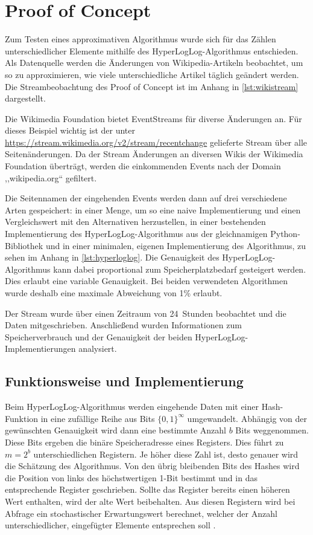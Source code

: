\section{Proof of Concept}

Zum Testen eines approximativen Algorithmus wurde sich für das Zählen unterschiedlicher Elemente mithilfe des HyperLogLog-Algorithmus entschieden.
Als Datenquelle werden die Änderungen von Wikipedia-Artikeln beobachtet, um so zu approximieren, wie viele unterschiedliche Artikel täglich geändert werden.
Die Streambeobachtung des Proof of Concept ist im Anhang in \autoref{lst:wikistream} dargestellt.

Die Wikimedia Foundation bietet EventStreams für diverse Änderungen an.
Für dieses Beispiel wichtig ist der unter \url{https://stream.wikimedia.org/v2/stream/recentchange} gelieferte Stream über alle Seitenänderungen.
Da der Stream Änderungen an diversen Wikis der Wikimedia Foundation überträgt, werden die einkommenden Events nach der Domain ,,wikipedia.org`` gefiltert.

Die Seitennamen der eingehenden Events werden dann auf drei verschiedene Arten gespeichert:  in einer Menge, um so eine naive Implementierung und einen Vergleichswert mit den Alternativen herzustellen, in einer bestehenden Implementierung des HyperLogLog-Algorithmus aus der gleichnamigen Python-Bibliothek \cite{evseenko2018} und in einer minimalen, eigenen Implementierung des Algorithmus, zu sehen im Anhang in \autoref{lst:hyperloglog}.
Die Genauigkeit des HyperLogLog-Algorithmus kann dabei proportional zum Speicherplatzbedarf gesteigert werden.
Dies erlaubt eine variable Genauigkeit.
Bei beiden verwendeten Algorithmen wurde deshalb eine maximale Abweichung von 1\% erlaubt.

Der Stream wurde über einen Zeitraum von 24~Stunden beobachtet und die Daten mitgeschrieben.
Anschließend wurden Informationen zum Speicherverbrauch und der Genauigkeit der beiden HyperLogLog-Implementierungen analysiert.

\subsection{Funktionsweise und Implementierung}
\label{sec:proof-of-concept-funktionsweise}

Beim HyperLogLog-Algorithmus werden eingehende Daten mit einer Hash-Funktion in eine zufällige Reihe aus Bits $\{0, 1\}^\infty$ umgewandelt.
Abhängig von der gewünschten Genauigkeit wird dann eine bestimmte Anzahl $b$ Bits weggenommen.
Diese Bits ergeben die binäre Speicheradresse eines Registers.
Dies führt zu $m=2^b$ unterschiedlichen Registern.
Je höher diese Zahl ist, desto genauer wird die Schätzung des Algorithmus.
Von den übrig bleibenden Bits des Hashes wird die Position von links des höchstwertigen 1-Bit bestimmt und in das entsprechende Register geschrieben.
Sollte das Register bereits einen höheren Wert enthalten, wird der alte Wert beibehalten.
Aus diesen Registern wird bei Abfrage ein stochastischer Erwartungswert berechnet, welcher der Anzahl unterschiedlicher, eingefügter Elemente entsprechen soll \cite{flajolet2007}.

